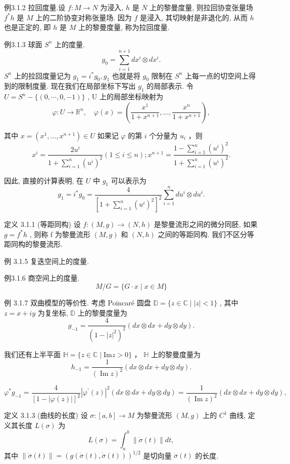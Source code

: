 \documentclass[]{article}
\begin{document}
例3.1.2 拉回度量.设 $f: M \to N$ 为浸入, $h$ 是 $N$ 上的黎曼度量, 则拉回协变张量场 $f^{*}h$ 是 $M$ 上的二阶协变对称张量场. 因为 $f$ 是浸入, 其切映射是非退化的, 从而 $h$ 也是正定的, 即 $h$ 是 $M$ 上的黎曼度量, 称为拉回度量. 

例3.1.3 球面 $S^n$ 上的度量. $$
g _ {0} = \sum_ {i = 1} ^ {n + 1} d x ^ {i} \otimes d x ^ {i}.
$$
$S^n$ 上的拉回度量记为 $g_1 = i^* g_0, g_1$ 也就是将 $g_0$ 限制在 $S^n$ 上每一点的切空间上得到的限制度量. 现在我们在局部坐标下写出 $g_{1}$ 的局部表示. 令 $U = S^{n} - \{(0, \cdots, 0, -1)\}$ , U 上的局部坐标映射为 $$
\varphi : U \to \mathbb {R} ^ {n}, \quad \varphi (x) = \left(\frac {x ^ {1}}{1 + x ^ {n + 1}}, \dots , \frac {x ^ {n}}{1 + x ^ {n + 1}}\right),
$$

其中 $x = (x^{1},\dots ,x^{n + 1})\in U$ 如果记 $\varphi$ 的第 $i$ 个分量为 $u_{i}$ ，则$$
x ^ {i} = \frac {2 u ^ {i}}{1 + \sum_ {i = 1} ^ {n} (u ^ {i}) ^ {2}} (1 \leqslant i \leqslant n); x ^ {n + 1} = \frac {1 - \sum_ {i = 1} ^ {n} (u ^ {i}) ^ {2}}{1 + \sum_ {i = 1} ^ {n} (u ^ {i}) ^ {2}}.
$$

 因此, 直接的计算表明, 在 $U$ 中 $g_{1}$ 可以表示为 $$
 g _ {1} = i ^ {*} g _ {0} = \frac {4}{\left[ 1 + \sum_ {i = 1} ^ {n} (u ^ {i}) ^ {2} \right] ^ {2}} \sum_ {i = 1} ^ {n} d u ^ {i} \otimes d u ^ {i}.
 $$
 
定义 3.1.1 (等距同构) 设 $f:(M,g)\to(N,h)$ 是黎曼流形之间的微分同胚, 如果 $g=f^{*}h$ , 则称 f 为黎曼流形 $(M,g)$ 和 $(N,h)$ 之间的等距同构. 我们不区分等距同构的黎曼流形. 

例 3.1.5 复迭空间上的度量. 

例3.1.6 商空间上的度量. $$
M / G = \{G \cdot x \mid x \in M \}
$$

例 3.1.7 双曲模型的等价性. 考虑 Poincaré 圆盘 $\mathbb{D} = \{z \in \mathbb{C} \mid |z| < 1\}$ , 其中 $z = x + iy$ 为复坐标, $\mathbb{D}$ 上的黎曼度量为 $$
g _ {- 1} = \frac {4}{(1 - | z | ^ {2}) ^ {2}} (d x \otimes d x + d y \otimes d y).
$$

我们还有上半平面 $\mathbb{H} = \{z\in \mathbb{C}\mid \mathrm{Im}z > 0\}$ ， $\mathbb{H}$ 上的黎曼度量为$$
h _ {- 1} = \frac {1}{(\operatorname{Im} z) ^ {2}} (d x \otimes d x + d y \otimes d y).
$$ 

$$
\varphi^ {*} g _ {- 1} = \frac {4}{[ 1 - | \varphi (z) | ] ^ {2}} | \varphi^ {\prime} (z) | ^ {2} (d x \otimes d x + d y \otimes d y) = \frac {1}{(\operatorname{Im} z) ^ {2}} (d x \otimes d x + d y \otimes d y),
$$

定义 3.1.3 (曲线的长度) 设 $\sigma:[a,b]\to M$ 为黎曼流形 $(M,g)$ 上的 $C^{1}$ 曲线, 定义其长度 $L(\sigma)$ 为 $$
L (\sigma) = \int_ {a} ^ {b} \| \dot {\sigma} (t) \| d t,
$$
其中 $\| \dot{\sigma}(t)\| = (g(\dot{\sigma}(t),\dot{\sigma}(t)))^{1 / 2}$ 是切向量 $\dot{\sigma} (t)$ 的长度. 
\end{document}
